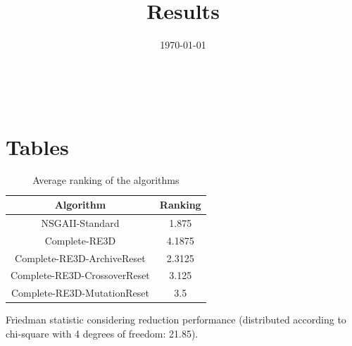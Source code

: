 \documentclass{article}
\title{Results}
\author{}
\date{\today}
\begin{document}
\oddsidemargin 0in \topmargin 0in\maketitle
\
\section{Tables}
\begin{table}[!htp]
\centering
\caption{Average ranking of the algorithms}
\begin{tabular}{c|c}
Algorithm&Ranking\\
\hline
NSGAII-Standard&1.875\\
Complete-RE3D&4.1875\\
Complete-RE3D-ArchiveReset&2.3125\\
Complete-RE3D-CrossoverReset&3.125\\
Complete-RE3D-MutationReset&3.5\\
\end{tabular}
\end{table}


Friedman statistic considering reduction performance (distributed according to chi-square with 4 degrees of freedom: 21.85).
\end{document}
